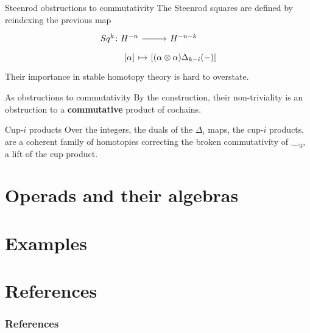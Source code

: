 \documentclass[10pt,t]{beamer}
\begin{document}
\begin{frame}[fragile]{Steenrod obstructions to commutativity}
	The Steenrod squares are defined by reindexing the previous map
	\begin{equation*}
	\begin{tikzcd}[row sep=tiny, column sep=tiny]
	Sq^k \colon H^{-n} \arrow[r] & H^{-n-k} \\
	\phantom{Sq^k \colon}{[\alpha]} \arrow[r, |->] & {\left[(\alpha \otimes \alpha)\Delta_{k-i}(-) \right]}
	\end{tikzcd}
	\end{equation*}
	Their importance in stable homotopy theory is hard to overstate.
	
	\begin{block}{As obstructions to commutativity}
		By the construction, their non-triviality is an obstruction to a \textbf{commutative} product of cochains.
	\end{block}

	\begin{block}{Cup-$i$ products}
		Over the integers, the duals of the $\Delta_i$ maps, the cup-$i$ products, are a coherent family of homotopies correcting the broken commutativity of $\smallsmile_0$, a lift of the cup product.
	\end{block}
\end{frame}


\section{Operads and their algebras}

\section{Examples}

\section*{References}

\begin{frame}%
	\frametitle{References}
	\nocite{whitney1935history}
	
	
\end{frame}
\end{document}
